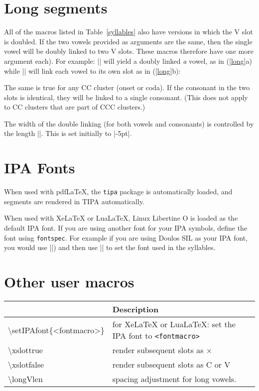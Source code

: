\documentclass[11pt]{article}
\newcommand*\bs{\textbackslash}
\newcommand*{\pkg}[1]{\texttt{#1}\xspace}
\begin{document}
\section{Long segments}
All of the macros listed in Table~{\ref{syllables}} also have versions in which the V slot is doubled. If the two vowels provided as arguments are the same, then the single vowel will be doubly linked to two V slots. These macros therefore have one more argument each). For example: || will yield a doubly linked \emph{a} vowel, as in (\ref{long}a)  while || will link each vowel to its own slot as in (\ref{long}b):

\begin{multicols}{2}
\begin{exe}
\ex\label{long}
\begin{xlist}
\ex {}
\ex {}
\end{xlist}
\end{exe}
\end{multicols}

The same is true for any CC cluster (onset or coda). If the consonant in the two slots is identical, they will be linked to a single consonant. (This does not apply to CC clusters that are part of CCC clusters.)

The width of the double linking (for both vowels and consonants) is controlled by the length |\longVlen|. This is set  initially to |-5pt|.

\section{IPA Fonts}
When used with pdfLaTeX, the \pkg{tipa} package is automatically loaded, and segments are rendered in TIPA automatically.

When used with XeLaTeX or LuaLaTeX, Linux Libertine O is loaded as the default IPA font. If you are using another font for your IPA symbols, define the font using \pkg{fontspec}.  For example if you are using Doulos SIL as your IPA font, you would use  |\newfontfamily{}|) and then use |\setIPAfont{\myipafont}| to set the font used in the syllables.

\section{Other user macros}
\begin{center}
\label{macros}
\medskip
\begin{tabularx}{.8\linewidth}{>{\ttfamily}lX}
\toprule
\multicolumn{1}{c}{Macro} & Description \\
\midrule
\bs setIPAfont\{<fontmacro>\} & for XeLaTeX or LuaLaTeX: set the IPA font to \texttt{<fontmacro>}\\
\bs xslottrue & render subsequent slots as $\times$\\
\bs xslotfalse & render subsequent slots as C or V\\
\bs longVlen & spacing adjustment for long vowels. \\
\bottomrule
\end{tabularx}
\end{center}
\clearpage
\end{document}
